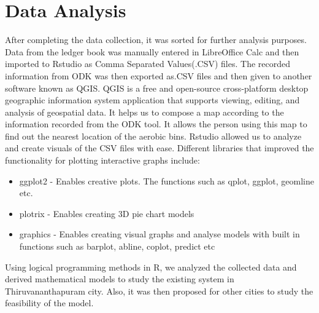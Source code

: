 \documentclass[12pt,a4paper]{report}
\begin{document}
\chapter{\textbf{Data Analysis}}
\begin{justify}
    After completing the data collection, it was sorted for further analysis purposes. Data from the ledger book was manually entered in LibreOffice Calc and then imported to Rstudio as Comma Separated Values(.CSV) files. The recorded information from ODK was then exported as.CSV files and then given to another software known as QGIS. QGIS is a free and open-source cross-platform desktop geographic information system application that supports viewing, editing, and analysis of geospatial data. It helps us to compose a map according to the information recorded from the ODK tool. It allows the person using this map to find out the nearest location of the aerobic bins.
   	Rstudio allowed us to analyze and create visuals of the CSV files with ease. Different libraries that improved the functionality for plotting interactive graphs include: 
\end{justify}
	
\begin{itemize}
\item ggplot2 - Enables creative plots. The functions such as qplot, ggplot, geomline etc.
\item plotrix - Enables creating 3D pie chart models
\item graphics - Enables creating visual graphs and analyse models with built in functions such as barplot, abline, coplot, predict etc
\end{itemize}

\begin{justify}
    Using logical programming methods in R, we analyzed the collected data and derived mathematical models to study the existing system in Thiruvananthapuram city.  Also, it was then proposed for other cities to study the feasibility of the model.
\end{justify}	
\end{document}
